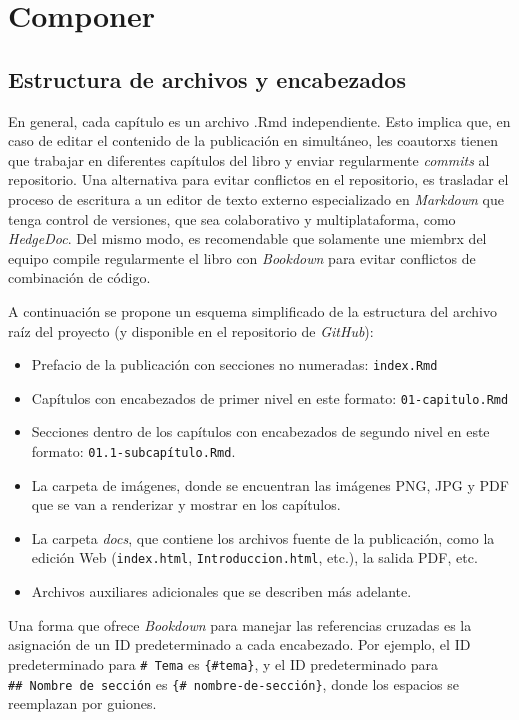 \documentclass[
]{krantz}
\begin{document}
\hypertarget{componer}{%
\chapter{Componer}\label{componer}}

\hypertarget{estructura-de-archivos-y-encabezados}{%
\section{Estructura de archivos y encabezados}\label{estructura-de-archivos-y-encabezados}}

En general, cada capítulo es un archivo .Rmd independiente. Esto implica que, en caso de editar el contenido de la publicación en simultáneo, les coautorxs tienen que trabajar en diferentes capítulos del libro y enviar regularmente \emph{commits} al repositorio. Una alternativa para evitar conflictos en el repositorio, es trasladar el proceso de escritura a un editor de texto externo especializado en \emph{Markdown} que tenga control de versiones, que sea colaborativo y multiplataforma, como \emph{HedgeDoc}. Del mismo modo, es recomendable que solamente une miembrx del equipo compile regularmente el libro con \emph{Bookdown} para evitar conflictos de combinación de código.

A continuación se propone un esquema simplificado de la estructura del archivo raíz del proyecto (y disponible en el repositorio de \emph{GitHub}):

\begin{itemize}
\item
  Prefacio de la publicación con secciones no numeradas: \texttt{index.Rmd}
\item
  Capítulos con encabezados de primer nivel en este formato: \texttt{01-capitulo.Rmd}
\item
  Secciones dentro de los capítulos con encabezados de segundo nivel en este formato: \texttt{01.1-subcapítulo.Rmd}.
\item
  La carpeta de imágenes, donde se encuentran las imágenes PNG, JPG y PDF que se van a renderizar y mostrar en los capítulos.
\item
  La carpeta \emph{docs}, que contiene los archivos fuente de la publicación, como la edición Web (\texttt{index.html}, \texttt{Introduccion.html}, etc.), la salida PDF, etc.
\item
  Archivos auxiliares adicionales que se describen más adelante.
\end{itemize}

Una forma que ofrece \emph{Bookdown} para manejar las referencias cruzadas es la asignación de un ID predeterminado a cada encabezado. Por ejemplo, el ID predeterminado para \texttt{\#\ Tema} es \texttt{\{\#tema\}}, y el ID predeterminado para \texttt{\#\#\ Nombre\ de\ sección} es \texttt{\{\#\ nombre-de-sección\}}, donde los espacios se reemplazan por guiones.
\end{document}
